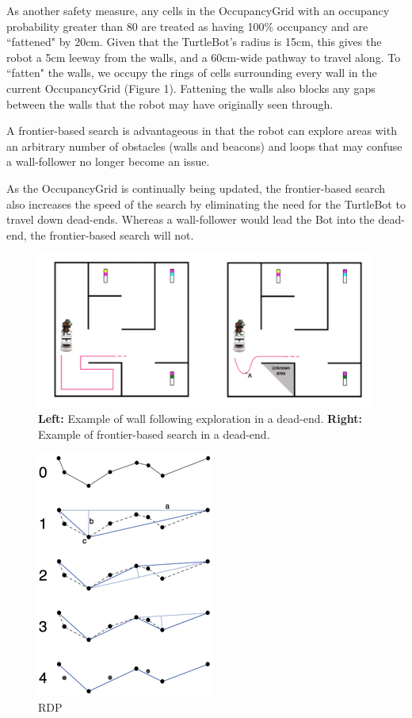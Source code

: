 \documentclass[titlepage,12pt,a4paper]{article}
\begin{document}
As another safety measure, any cells in the OccupancyGrid with an occupancy probability greater than 80 are treated as having 100\% occupancy and are ``fattened" by 20cm. Given that the TurtleBot's radius is 15cm, this gives the robot a 5cm leeway from the walls, and a 60cm-wide pathway to travel along. To ``fatten" the walls, we occupy the rings of cells surrounding every wall in the current OccupancyGrid (Figure 1). Fattening the walls also blocks any gaps between the walls that the robot may have originally seen through. 

A frontier-based search is advantageous in that the robot can explore areas with an arbitrary number of obstacles (walls and beacons) and loops that may confuse a wall-follower no longer become an issue. 

As the OccupancyGrid is continually being updated, the frontier-based search also increases the speed of the search by eliminating the need for the TurtleBot to travel down dead-ends. Whereas a wall-follower would lead the Bot into the dead-end, the frontier-based search will not.

\begin{figure}[h]
	\centering
	\includegraphics[scale=0.7]{paths.png}
	\caption{\textbf{Left:} Example of wall following exploration in a dead-end. \textbf{Right:} Example of frontier-based search in a dead-end.}
\end{figure}

\pagebreak

\begin{figure}
	\includegraphics[scale=0.5]{rdp.png}
	\caption{RDP}
\end{figure}
\end{document}
